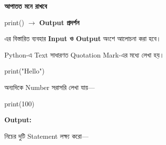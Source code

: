 \begin{rememberbox}

\textbf{\color{deepOrange}আপাতত মনে রাখবে}

\begin{center}

\textenglish{\ttfamily print()}
\(\longrightarrow\)
\textbf{Output প্রদর্শন}

\end{center}

এর বিস্তারিত ব্যবহার
\textbf{Input ও Output}
অংশে আলোচনা করা হবে।

\end{rememberbox}



Python-এ Text সাধারণত Quotation Mark-এর মধ্যে লেখা হয়।

\begin{codebox}

\begin{english}
\ttfamily
print("Hello")
\end{english}

\end{codebox}

অন্যদিকে Number সরাসরি লেখা যায়—

\begin{codebox}

\begin{english}
\ttfamily
print(100)
\end{english}

\end{codebox}

\textbf{Output:}

\begin{codebox}

\begin{english}
\end{english}

\end{codebox}



নিচের দুটি Statement লক্ষ্য করো—

